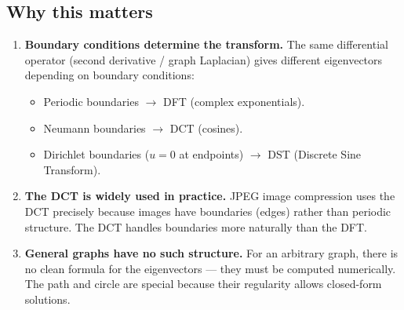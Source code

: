 \begin{notechapter}
\subsection{Why this matters}

\begin{enumerate}
\item \textbf{Boundary conditions determine the transform.} The same
      differential operator (second derivative / graph Laplacian) gives
      different eigenvectors depending on boundary conditions:
      \begin{itemize}
          \item Periodic boundaries $\rightarrow$ DFT (complex exponentials).
          \item Neumann boundaries $\rightarrow$ DCT (cosines).
          \item Dirichlet boundaries ($u = 0$ at endpoints) $\rightarrow$
                DST (Discrete Sine Transform).
      \end{itemize}

\item \textbf{The DCT is widely used in practice.} JPEG image compression
      uses the DCT precisely because images have boundaries (edges) rather
      than periodic structure. The DCT handles boundaries more naturally
      than the DFT.

\item \textbf{General graphs have no such structure.} For an arbitrary
      graph, there is no clean formula for the eigenvectors --- they must
      be computed numerically. The path and circle are special because
      their regularity allows closed-form solutions.
\end{enumerate}

\begin{figure}[H]
\centering
{}
\end{figure}
\end{notechapter}
